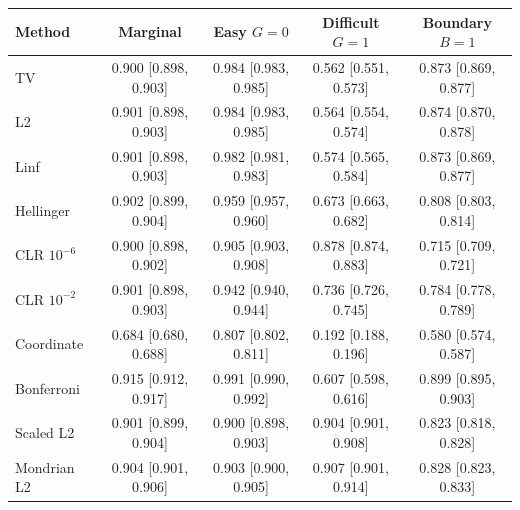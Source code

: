 \begin{tabular}{lcccc}
\toprule
Method & Marginal & Easy $G=0$ & Difficult $G=1$ & Boundary $B=1$ \\
\midrule
TV & 0.900 [0.898, 0.903] & 0.984 [0.983, 0.985] & 0.562 [0.551, 0.573] & 0.873 [0.869, 0.877] \\
L2 & 0.901 [0.898, 0.903] & 0.984 [0.983, 0.985] & 0.564 [0.554, 0.574] & 0.874 [0.870, 0.878] \\
Linf & 0.901 [0.898, 0.903] & 0.982 [0.981, 0.983] & 0.574 [0.565, 0.584] & 0.873 [0.869, 0.877] \\
Hellinger & 0.902 [0.899, 0.904] & 0.959 [0.957, 0.960] & 0.673 [0.663, 0.682] & 0.808 [0.803, 0.814] \\
CLR $10^{-6}$ & 0.900 [0.898, 0.902] & 0.905 [0.903, 0.908] & 0.878 [0.874, 0.883] & 0.715 [0.709, 0.721] \\
CLR $10^{-2}$ & 0.901 [0.898, 0.903] & 0.942 [0.940, 0.944] & 0.736 [0.726, 0.745] & 0.784 [0.778, 0.789] \\
Coordinate & 0.684 [0.680, 0.688] & 0.807 [0.802, 0.811] & 0.192 [0.188, 0.196] & 0.580 [0.574, 0.587] \\
Bonferroni & 0.915 [0.912, 0.917] & 0.991 [0.990, 0.992] & 0.607 [0.598, 0.616] & 0.899 [0.895, 0.903] \\
Scaled L2 & 0.901 [0.899, 0.904] & 0.900 [0.898, 0.903] & 0.904 [0.901, 0.908] & 0.823 [0.818, 0.828] \\
Mondrian L2 & 0.904 [0.901, 0.906] & 0.903 [0.900, 0.905] & 0.907 [0.901, 0.914] & 0.828 [0.823, 0.833] \\
\bottomrule
\end{tabular}
